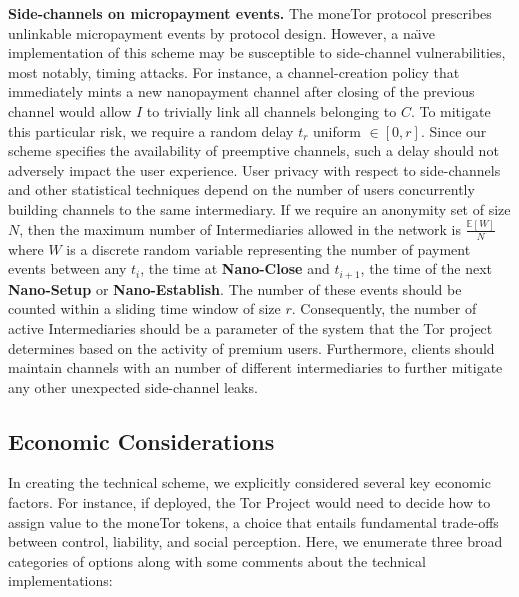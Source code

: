\medskip \noindent\textbf{Side-channels on micropayment events.}
The moneTor protocol prescribes unlinkable micropayment events by protocol design.
However, a na\"{\i}ve implementation of this scheme may be susceptible to side-channel vulnerabilities, most notably, timing attacks.
For instance, a channel-creation policy that immediately mints a new nanopayment channel after closing of the previous channel would allow $I$ to trivially link all channels belonging to $C$.
To mitigate this particular risk, we require a random delay $t_r$ uniform $\in [0, r]$.
Since our scheme specifies the availability of preemptive channels, such a delay should not adversely impact the user experience.
User privacy with respect to side-channels and other statistical techniques depend on the number of users concurrently building channels to the same intermediary.
If we require an anonymity set of size $N$, then the maximum number of Intermediaries allowed in the network is $\frac{\mathbb{E}[W]}{N}$ where $W$ is a discrete random variable representing the number of payment events between any $t_i$, the time at \textbf{Nano-Close} and $t_{i+1}$, the time of the next \textbf{Nano-Setup} or \textbf{Nano-Establish}.
The number of these events should be counted within a sliding time window of size $r$.
Consequently, the number of active Intermediaries should be a parameter of the system that the Tor project determines based on the activity of premium users.
Furthermore, clients should maintain channels with an number of different intermediaries to further mitigate any other unexpected side-channel leaks.

\subsection{Economic Considerations}
\label{sec:economic_considerations}

In creating the technical scheme, we explicitly considered several key economic factors.
For instance, if deployed, the Tor Project would need to decide how to assign value to the moneTor tokens, a choice that entails fundamental trade-offs between control, liability, and social perception.
Here, we enumerate three broad categories of options along with some comments about the technical implementations:

